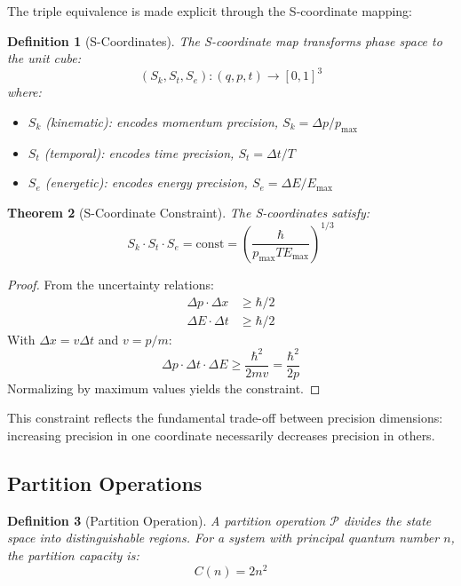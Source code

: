 \documentclass[aps,prl,twocolumn,superscriptaddress,floatfix]{revtex4-2}
\newtheorem{theorem}{Theorem}
\newtheorem{definition}[theorem]{Definition}
\begin{document}
The triple equivalence is made explicit through the S-coordinate mapping:

\begin{definition}[S-Coordinates]
The S-coordinate map transforms phase space to the unit cube:
\begin{equation}
(S_k, S_t, S_e) : (q, p, t) \to [0,1]^3
\end{equation}
where:
\begin{itemize}
\item $S_k$ (kinematic): encodes momentum precision, $S_k = \Delta p / p_{\max}$
\item $S_t$ (temporal): encodes time precision, $S_t = \Delta t / T$
\item $S_e$ (energetic): encodes energy precision, $S_e = \Delta E / E_{\max}$
\end{itemize}
\end{definition}

\begin{theorem}[S-Coordinate Constraint]
The S-coordinates satisfy:
\begin{equation}
S_k \cdot S_t \cdot S_e = \text{const} = \left(\frac{\hbar}{p_{\max} T E_{\max}}\right)^{1/3}
\end{equation}
\end{theorem}

\begin{proof}
From the uncertainty relations:
\begin{align}
\Delta p \cdot \Delta x &\geq \hbar/2 \\
\Delta E \cdot \Delta t &\geq \hbar/2
\end{align}
With $\Delta x = v \Delta t$ and $v = p/m$:
\begin{equation}
\Delta p \cdot \Delta t \cdot \Delta E \geq \frac{\hbar^2}{2m v} = \frac{\hbar^2}{2p}
\end{equation}
Normalizing by maximum values yields the constraint.
\end{proof}

This constraint reflects the fundamental trade-off between precision dimensions: increasing precision in one coordinate necessarily decreases precision in others.

\subsection{Partition Operations}

\begin{definition}[Partition Operation]
A partition operation $\mathcal{P}$ divides the state space into distinguishable regions. For a system with principal quantum number $n$, the partition capacity is:
\begin{equation}
C(n) = 2n^2
\end{equation}
\end{definition}
\end{document}
